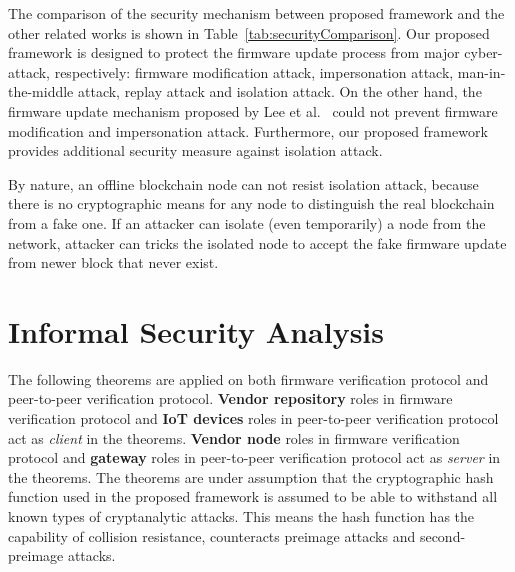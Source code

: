 The comparison of the security mechanism between proposed framework and the other related works is shown in Table~\ref{tab:securityComparison}. Our proposed framework is designed to protect the firmware update process from major cyber-attack, respectively: firmware modification attack, impersonation attack, man-in-the-middle attack, replay attack and isolation attack. On the other hand, the firmware update mechanism proposed by Lee et al.~\cite{lee} could not prevent firmware modification and impersonation attack. Furthermore, our proposed framework provides additional security measure against isolation attack.

By nature, an offline blockchain node can not resist isolation attack, because there is no cryptographic means for any node to distinguish the real blockchain from a fake one. If an attacker can isolate (even temporarily) a node from the network, attacker can tricks the isolated node to accept the fake firmware update from newer block that never exist.

\section{Informal Security Analysis} 
\label{sec:securityOverInsecure}

The following theorems are applied on both firmware verification protocol and peer-to-peer verification protocol. \textbf{Vendor repository} roles in firmware verification protocol and \textbf{IoT devices} roles in peer-to-peer verification protocol act as \textit{client} in the theorems. \textbf{Vendor node} roles in firmware verification protocol and \textbf{gateway} roles in peer-to-peer verification protocol act as \textit{server} in the theorems. The theorems are under assumption that the cryptographic hash function used in the proposed framework is assumed to be able to withstand all known types of cryptanalytic attacks. This means the hash function has the capability of collision resistance, counteracts preimage attacks and second-preimage attacks.

